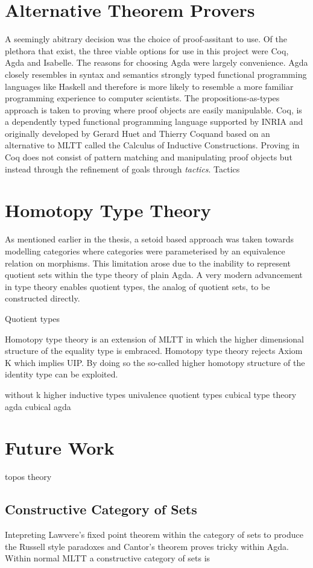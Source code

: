 \section{Alternative Theorem Provers}
A seemingly abitrary decision was the choice of proof-assitant to use. Of the
plethora that exist, the three viable options for use in this project were Coq,
Agda and Isabelle. The reasons for choosing Agda were largely convenience. Agda
closely resembles in syntax and semantics strongly typed functional programming
languages like Haskell and therefore is more likely to resemble a more familiar
programming experience to computer scientists. The propositions-as-types
approach is taken to proving where proof objects are easily manipulable. Coq, is
a dependently typed functional programming language supported by INRIA and
originally developed by Gerard Huet and Thierry Coquand based on an alternative
to MLTT called the Calculus of Inductive Constructions. Proving in Coq does not
consist of pattern matching and manipulating proof objects but instead through
the refinement of goals through \textit{tactics}. Tactics 
\section{Homotopy Type Theory}
As mentioned earlier in the thesis, a setoid based approach was taken towards
modelling categories where categories were parameterised by an equivalence
relation on morphisms. This limitation arose due to the inability to represent
quotient sets within the type theory of plain Agda. A very modern advancement in
type theory enables quotient types, the analog of quotient sets, to be
constructed directly.

Quotient types

Homotopy type theory is an extension of MLTT in which the
higher dimensional structure of the equality type is embraced. Homotopy type
theory rejects Axiom K which implies UIP. By doing so the so-called higher
homotopy structure of the identity type can be exploited.

without k
higher inductive types
univalence
quotient types
cubical type theory agda
cubical agda

\section{Future Work}
topos theory

\subsection{Constructive Category of Sets}
Intepreting Lawvere's fixed point theorem within the category of sets to
produce the Russell style paradoxes and Cantor's theorem proves tricky within
Agda. Within normal MLTT a constructive category of sets is

